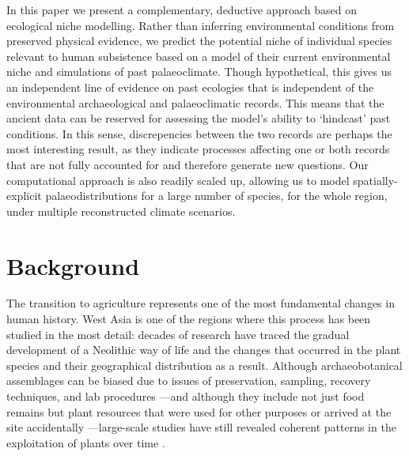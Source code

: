 \documentclass[
  authoryear,
  preprint]{elsarticle}
\begin{document}
In this paper we present a complementary, deductive approach based on
ecological niche modelling. Rather than inferring environmental
conditions from preserved physical evidence, we predict the potential
niche of individual species relevant to human subsistence based on a
model of their current environmental niche and simulations of past
palaeoclimate. Though hypothetical, this gives us an independent line of
evidence on past ecologies that is independent of the environmental
archaeological and palaeoclimatic records. This means that the ancient
data can be reserved for assessing the model's ability to `hindcast'
past conditions. In this sense, discrepencies between the two records
are perhaps the most interesting result, as they indicate processes
affecting one or both records that are not fully accounted for and
therefore generate new questions. Our computational approach is also
readily scaled up, allowing us to model spatially-explicit
palaeodistributions for a large number of species, for the whole region,
under multiple reconstructed climate scenarios.

\section{Background}\label{sec-bg}

The transition to agriculture represents one of the most fundamental
changes in human history. West Asia is one of the regions where this
process has been studied in the most detail: decades of research have
traced the gradual development of a Neolithic way of life and the
changes that occurred in the plant species and their geographical
distribution as a result. Although archaeobotanical assemblages can be
biased due to issues of preservation, sampling, recovery techniques, and
lab procedures \citep{Dennel1976, HastorfPopper1988}---and although they
include not just food remains but plant resources that were used for
other purposes or arrived at the site accidentally
\citep{HastorfPopper1988}---large-scale studies have still revealed
coherent patterns in the exploitation of plants over time
\citep{ColledgeEtAl2004, ArranzOtaeguiEtAl2016}.
\end{document}
